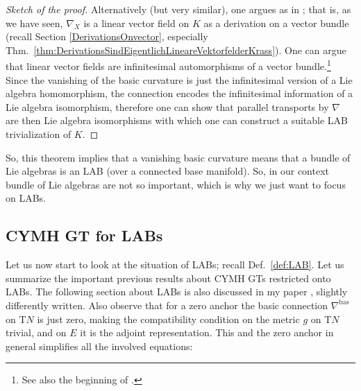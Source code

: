 \begin{proof}[Sketch of the proof]
Alternatively (but very similar), one argues as in \cite[Proposition 2.13]{basicconn}; that is, as we have seen, $\nabla_X$ is a linear vector field on $K$ as a derivation on a vector bundle (recall Section \ref{DerivationsOnvector}, especially Thm.~\ref{thm:DerivationsSindEigentlichLineareVektorfelderKrass}). One can argue that linear vector fields are infinitesimal automorphisms of a vector bundle.\footnote{See also the beginning of \cite{meinrenkensplitting}.} Since the vanishing of the basic curvature is just the infinitesimal version of a Lie algebra homomorphism, the connection encodes the infinitesimal information of a Lie algebra isomorphism, therefore one can show that parallel transports by $\nabla$ are then Lie algebra isomorphisms with which one can construct a suitable LAB trivialization of $K$.
\end{proof}

So, this theorem implies that a vanishing basic curvature means that a bundle of Lie algebras is an LAB (over a connected base manifold). So, in our context bundle of Lie algebras are not so important, which is why we just want to focus on LABs.

\subsection{CYMH GT for LABs}\label{SumamryForLABSituation}

Let us now start to look at the situation of LABs; recall Def.~\ref{def:LAB}. Let us summarize the important previous results about CYMH GTs restricted onto LABs. The following section about LABs is also discussed in my paper \cite{My1stpaper}, slightly differently written. Also observe that for a zero anchor the basic connection $\nabla^{\mathrm{bas}}$ on $\mathrm{T}N$ is just zero, making the compatibility condition on the metric $g$ on $\mathrm{T}N$ trivial, and on $E$ it is the adjoint representation. This and the zero anchor in general simplifies all the involved equations:

